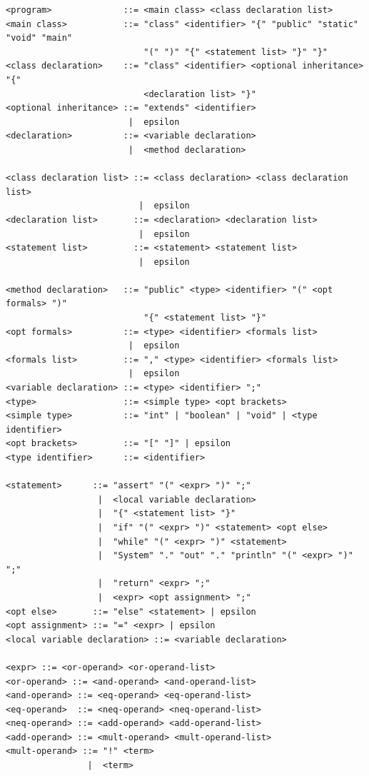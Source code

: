 \documentclass[a4paper,11pt]{article}
\begin{document}
\begin{verbatim}
<program>              ::= <main class> <class declaration list>
<main class>           ::= "class" <identifier> "{" "public" "static" "void" "main"
                           "(" ")" "{" <statement list> "}" "}"
<class declaration>    ::= "class" <identifier> <optional inheritance> "{"
                           <declaration list> "}"
<optional inheritance> ::= "extends" <identifier>
                        |  epsilon
<declaration>          ::= <variable declaration>
                        |  <method declaration>

<class declaration list> ::= <class declaration> <class declaration list>
                          |  epsilon
<declaration list>       ::= <declaration> <declaration list>
                          |  epsilon
<statement list>         ::= <statement> <statement list>
                          |  epsilon

<method declaration>   ::= "public" <type> <identifier> "(" <opt formals> ")"
                           "{" <statement list> "}"
<opt formals>          ::= <type> <identifier> <formals list>
                        |  epsilon
<formals list>         ::= "," <type> <identifier> <formals list>
                        |  epsilon
<variable declaration> ::= <type> <identifier> ";"
<type>                 ::= <simple type> <opt brackets>
<simple type>          ::= "int" | "boolean" | "void" | <type identifier>
<opt brackets>         ::= "[" "]" | epsilon
<type identifier>      ::= <identifier>

<statement>      ::= "assert" "(" <expr> ")" ";"
                  |  <local variable declaration>
                  |  "{" <statement list> "}"
                  |  "if" "(" <expr> ")" <statement> <opt else>
                  |  "while" "(" <expr> ")" <statement>
                  |  "System" "." "out" "." "println" "(" <expr> ")" ";"
                  |  "return" <expr> ";"
                  |  <expr> <opt assignment> ";"
<opt else>       ::= "else" <statement> | epsilon
<opt assignment> ::= "=" <expr> | epsilon
<local variable declaration> ::= <variable declaration>

<expr> ::= <or-operand> <or-operand-list>
<or-operand> ::= <and-operand> <and-operand-list>
<and-operand> ::= <eq-operand> <eq-operand-list>
<eq-operand>  ::= <neq-operand> <neq-operand-list>
<neq-operand> ::= <add-operand> <add-operand-list>
<add-operand> ::= <mult-operand> <mult-operand-list>
<mult-operand> ::= "!" <term>
                |  <term>


\end{verbatim}
\end{document}
